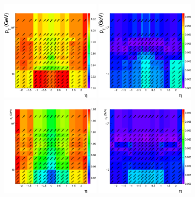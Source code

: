 \begin{figure}[htbp]
  \begin{center}
		\includegraphics[width=0.45\textwidth]{Figures/Muons/2016_SF_legacy_newLoose.png}
    \includegraphics[width=0.45\textwidth]{Figures/Muons/2016_SF_errors_legacy_newLoose.png} \\
		\includegraphics[width=0.45\textwidth]{Figures/Muons/2017_SF_rereco_LooseGT20syst.png}
    \includegraphics[width=0.45\textwidth]{Figures/Muons/2017_SF_errors_rereco_LooseGT20syst.png} \\

\end{center}
\end{figure}

